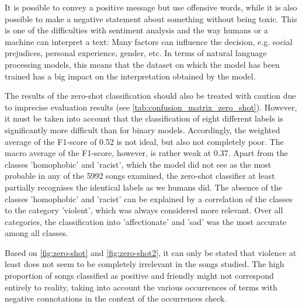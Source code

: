 It is possible to convey a positive message but use offensive words, while it is also possible to make a negative statement about something without being toxic. This is one of the difficulties with sentiment analysis and the way humans or a machine can interpret a text: Many factors can influence the decision, e.g. social prejudices, personal experience, gender, etc. In terms of natural language processing models, this means that the dataset on which the model has been trained has a big impact on the interpretation obtained by the model. 

The results of the zero-shot classification should also be treated with caution due to imprecise evaluation results (see \autoref{tab:confusion_matrix_zero_shot}). However, it must be taken into account that the classification of eight different labels is significantly more difficult than for binary models. Accordingly, the weighted average of the F1-score of 0.52 is not ideal, but also not completely poor. The macro average of the F1-score, however, is rather weak at 0.37. Apart from the classes 'homophobic' and 'racist', which the model did not see as the most probable in any of the 5992 songs examined, the zero-shot classifier at least partially recognises the identical labels as we humans did. The absence of the classes 'homophobic' and 'racist' can be explained by a correlation of the classes to the category 'violent', which was always considered more relevant. Over all categories, the classification into 'affectionate' and 'sad' was the most accurate among all classes.

Based on \autoref{fig:zero-shot} and \autoref{fig:zero-shot2}, it can only be stated that violence at least does not seem to be completely irrelevant in the songs studied. The high proportion of songs classified as positive and friendly might not correspond entirely to reality, taking into account the various occurrences of terms with negative connotations in the context of the occurrences check.

